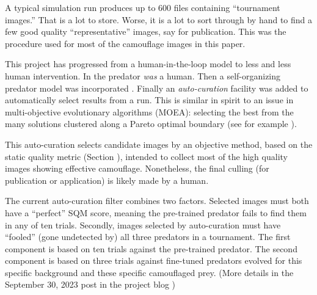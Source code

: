 \documentclass[letterpaper]{article}
\newcommand{\jargon}[1]{\textit{#1}}
\begin{document}
A typical simulation run produces up to 600 files containing “tournament images.” That is a lot to store. Worse, it is a lot to sort through by hand to find a few good quality “representative” images, say for publication. This was the procedure used for most of the camouflage images in this paper.
\par
This project has progressed from a human-in-the-loop model to less and less human intervention. In \citet{reynolds_iec_2011} the predator \textit{was} a human. Then a self-organizing predator model was incorporated \citep{reynolds_coevolution_2023}. Finally an \jargon{auto-curation} facility was added to automatically select results from a run. This is similar in spirit to an issue in multi-objective evolutionary algorithms (MOEA): selecting the best from the many solutions clustered along a Pareto optimal boundary (see for example \citet{ishibuchi_difficulties_2022}).
\par
This auto-curation selects candidate images by an objective method, based on the static quality metric (Section ), intended to collect most of the high quality images showing effective camouflage. Nonetheless, the final culling (for publication or application) is likely made by a human.
\par
The current auto-curation filter combines two factors. Selected images must both have a “perfect” SQM score, meaning the pre-trained predator fails to find them in any of ten trials. Secondly, images selected by auto-curation must have “fooled” (gone undetected by) all three predators in a tournament. The first component is based on ten trials against the pre-trained predator. The second component is based on three trials against fine-tuned predators evolved for this specific background and these specific camouflaged prey. (More details in the September 30, 2023 post in the project blog \citep{reynolds_texsyn_blog_2023})
\par
\end{document}
